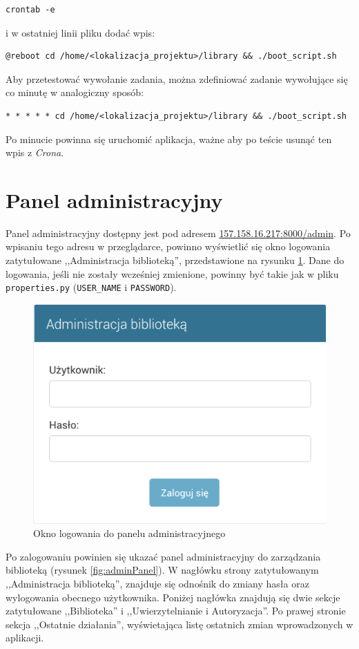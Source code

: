 \documentclass[twoside]{projektInzynierskiMS}
\begin{document}
\begin{verbatim}
crontab -e
\end{verbatim}

i w ostatniej linii pliku dodać wpis:

\begin{verbatim}
@reboot cd /home/<lokalizacja_projektu>/library && ./boot_script.sh
\end{verbatim}

Aby przetestować wywołanie zadania, można zdefiniować zadanie wywołujące się co minutę w analogiczny sposób:

\begin{verbatim}
* * * * * cd /home/<lokalizacja_projektu>/library && ./boot_script.sh
\end{verbatim}

Po minucie powinna się uruchomić aplikacja, ważne aby po teście usunąć ten wpis z \textit{Crona}. 


\section{Panel administracyjny}

Panel administracyjny dostępny jest pod adresem \href{http://157.158.16.217:8000/admin}{157.158.16.217:8000/admin}. Po wpisaniu tego adresu w przeglądarce, powinno wyświetlić się okno logowania zatytułowane ,,Administracja biblioteką'', przedstawione na rysunku \ref{fig:adminLogin}. Dane do logowania, jeśli nie zostały wcześniej zmienione, powinny być takie jak w pliku \verb`properties.py` (\verb`USER_NAME` i \verb`PASSWORD`). 

\begin{figure}[h]
  \centering
  \includegraphics[width=0.4\linewidth]{img/backend/oknLogowania.png}
  \caption{Okno logowania do panelu administracyjnego}
  \label{fig:adminLogin}
\end{figure}

Po zalogowaniu powinien się ukazać panel administracyjny do zarządzania biblioteką (rysunek \ref{fig:adminPanel}). W nagłówku strony zatytułowanym ,,Administracja biblioteką'', znajduje się odnośnik do zmiany hasła oraz wylogowania obecnego użytkownika. Poniżej nagłówka znajdują się dwie sekcje zatytułowane ,,Biblioteka'' i ,,Uwierzytelnianie i Autoryzacja''. Po prawej stronie sekcja ,,Ostatnie działania'', wyświetająca listę ostatnich zmian wprowadzonych w aplikacji.
\end{document}
